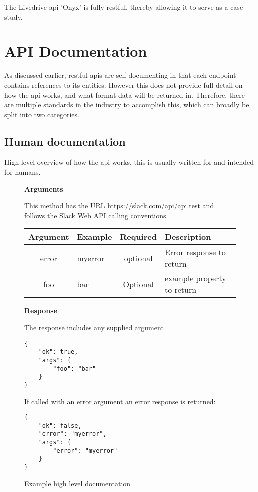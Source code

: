 The Livedrive api 'Onyx' is fully restful, thereby allowing it to serve as a case study.



\section{API Documentation}

As discussed earlier, restful apis are self documenting in that each endpoint contains references to its entities. However this does not provide full detail on how the api works, and what format data will be returned in. Therefore, there are multiple standards in the industry to accomplish this, which can broadly be split into two categories.

\subsection{Human documentation}

High level overview of how the api works, this is usually written for and intended for humans.

\begin{figure}[ht]

\textbf{Arguments}

This method has the URL \url{https://slack.com/api/api.test} and follows the Slack Web API calling conventions.

\begin{tabularx}{\textwidth}{c|X|c|X}
\textbf{Argument} & \textbf{Example} & \textbf{Required} & \textbf{Description} \\ \hline
error & myerror & optional & Error response to return \\
foo & bar & Optional & example property to return \\
\end{tabularx}


\textbf{Response}

The response includes any supplied argument

\begin{code}
\begin{verbatim}
{
    "ok": true,
    "args": {
        "foo": "bar"
    }
}
\end{verbatim}
\end{code}

If called with an error argument an error response is returned:

\begin{code}
\begin{verbatim}
{
    "ok": false,
    "error": "myerror",
    "args": {
        "error": "myerror"
    }
}
\end{verbatim}
\end{code}
\caption{Example high level documentation}
\end{figure}

